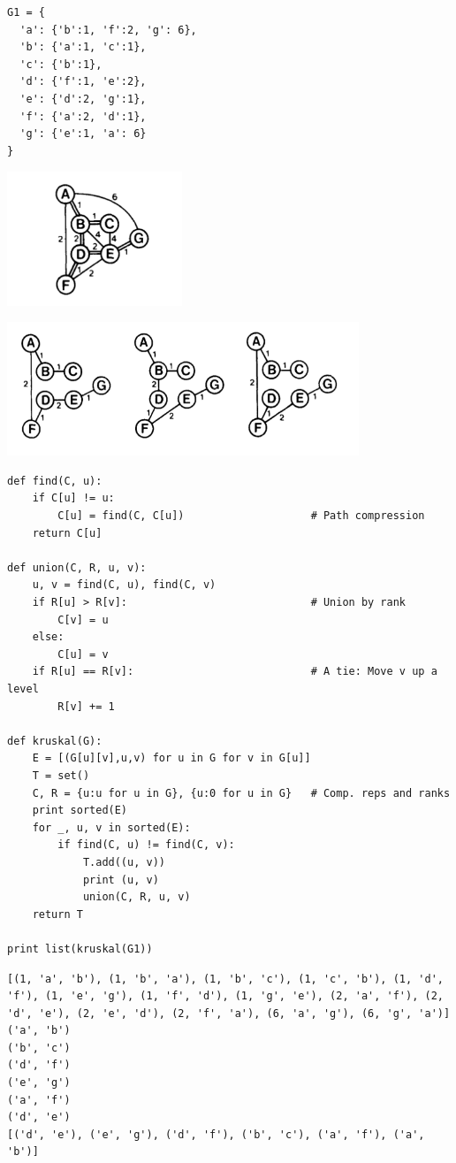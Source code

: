 \documentclass[12pt,fleqn]{article}\usepackage{../common}
\begin{document}
\begin{verbatim}
G1 = {
  'a': {'b':1, 'f':2, 'g': 6},
  'b': {'a':1, 'c':1},
  'c': {'b':1},
  'd': {'f':1, 'e':2},
  'e': {'d':2, 'g':1},
  'f': {'a':2, 'd':1},
  'g': {'e':1, 'a': 6}
}
\end{verbatim}

\includegraphics[height=4cm]{minspan_0.png}

\includegraphics[height=4cm]{minspan_1.png}


\begin{verbatim}
def find(C, u):
    if C[u] != u:
        C[u] = find(C, C[u])                    # Path compression
    return C[u]

def union(C, R, u, v):
    u, v = find(C, u), find(C, v)
    if R[u] > R[v]:                             # Union by rank
        C[v] = u
    else:
        C[u] = v
    if R[u] == R[v]:                            # A tie: Move v up a level
        R[v] += 1

def kruskal(G):
    E = [(G[u][v],u,v) for u in G for v in G[u]]
    T = set()
    C, R = {u:u for u in G}, {u:0 for u in G}   # Comp. reps and ranks
    print sorted(E)
    for _, u, v in sorted(E):
        if find(C, u) != find(C, v):
            T.add((u, v))
            print (u, v)
            union(C, R, u, v)
    return T

print list(kruskal(G1))
\end{verbatim}

\begin{verbatim}
[(1, 'a', 'b'), (1, 'b', 'a'), (1, 'b', 'c'), (1, 'c', 'b'), (1, 'd', 'f'), (1, 'e', 'g'), (1, 'f', 'd'), (1, 'g', 'e'), (2, 'a', 'f'), (2, 'd', 'e'), (2, 'e', 'd'), (2, 'f', 'a'), (6, 'a', 'g'), (6, 'g', 'a')]
('a', 'b')
('b', 'c')
('d', 'f')
('e', 'g')
('a', 'f')
('d', 'e')
[('d', 'e'), ('e', 'g'), ('d', 'f'), ('b', 'c'), ('a', 'f'), ('a', 'b')]
\end{verbatim}
\end{document}
